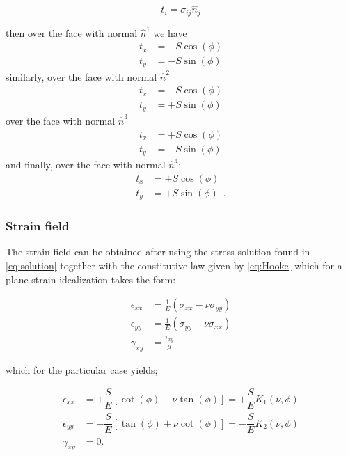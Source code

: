 \[t_{i} = \sigma_{ij}\hat{n}_{j}\]

then over the face with normal $\hat{n}^1$ we have
\begin{align*}
t_{x} &= -S\cos(\phi)\\
t_{y} &= -S\sin(\phi)
\end{align*}
similarly, over the face with normal $\hat{n}^2$
\begin{align*}
t_{x} &= -S\cos(\phi)\\
t_{y} &= +S\sin(\phi)
\end{align*}
over the face with normal $\hat{n}^3$ 
\begin{align*}
t_{x} &= +S\cos(\phi)\\
t_{y} &= -S\sin(\phi)
\end{align*}
and finally, over the face with normal $\hat{n}^4$;
\begin{align*}
t_{x} &= +S\cos(\phi)\\
t_{y} &= +S\sin(\phi) \enspace .
\end{align*}

\subsubsection*{Strain field}
The strain field can be obtained after using the stress solution found in \cref{eq:solution} together with the constitutive law given by \cref{eq:Hooke} which for a plane strain idealization takes the form:

\begin{equation}
\begin{aligned}
{\epsilon _{xx}}& = \frac{1}{E}({\sigma _{xx}} - \nu {\sigma _{yy}}) \\
{\epsilon _{yy}}& = \frac{1}{E}({\sigma _{yy}} - \nu {\sigma _{xx}}) \\
{\gamma _{xy}}& = \frac{{{\tau _{xy}}}}{\mu }
\end{aligned}
\label{eq:cons model}
\end{equation}

which for the particular case yields;


\begin{equation}
\begin{aligned}
\epsilon_{xx}& = +\dfrac{S}{E}\left[\cot(\phi)+\nu \tan(\phi)\right] = +\dfrac{S}{E}K_{1}(\nu , \phi)\\
\epsilon_{yy}& = -\dfrac{S}{E}\left[\tan(\phi)+\nu \cot(\phi)\right] = -\dfrac{S}{E}K_{2}(\nu , \phi)\\
\gamma_{xy}& = 0.
\end{aligned}
\label{eq:strain part}
\end{equation}

